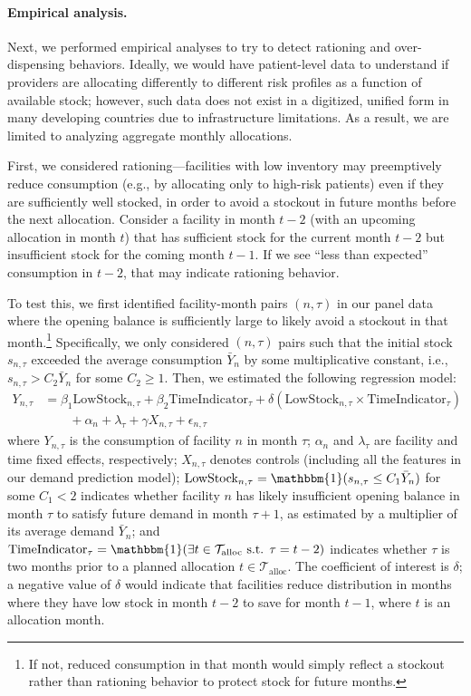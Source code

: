 \documentclass[12pt]{article}
\begin{document}
\paragraph{Empirical analysis.}

Next, we performed empirical analyses to try to detect rationing and over-dispensing behaviors. Ideally, we would have patient-level data to understand if providers are allocating differently to different risk profiles as a function of available stock; however, such data does not exist in a digitized, unified form in many developing countries due to infrastructure limitations. As a result, we are limited to analyzing aggregate monthly allocations.

First, we considered rationing---facilities with low inventory may preemptively reduce consumption (e.g., by allocating only to high-risk patients) even if they are sufficiently well stocked, in order to avoid a stockout in future months before the next allocation. Consider a facility in month $t-2$ (with an upcoming allocation in month $t$) that has sufficient stock for the current month $t-2$ but insufficient stock for the coming month $t-1$. If we see ``less than expected'' consumption in $t-2$, that may indicate rationing behavior.

To test this, we first identified facility-month pairs $(n,\tau)$ in our panel data where the opening balance is sufficiently large to likely avoid a stockout in that month.\footnote{If not, reduced consumption in that month would simply reflect a stockout rather than rationing behavior to protect stock for future months.} Specifically, we only considered $(n,\tau)$ pairs such that the initial stock $s_{n,\tau}$ exceeded the average consumption $\bar{Y}_n$ by some multiplicative constant, i.e., $s_{n,\tau}>C_2\bar{Y}_n$ for some $C_2\ge1$. Then, we estimated the following regression model:
\begin{align}
\label{eqn:rationingspec}
Y_{n,\tau} &= \beta_1 \text{LowStock}_{n,\tau} + \beta_2 \text{TimeIndicator}_\tau
+ \delta (\text{LowStock}_{n,\tau} \times \text{TimeIndicator}_\tau) \nonumber\\
&\qquad+ \alpha_n + \lambda_\tau + \gamma X_{n,\tau} + \epsilon_{n,\tau}
\end{align}
where $Y_{n,\tau}$ is the consumption of facility $n$ in month $\tau$; $\alpha_n$ and $\lambda_\tau$ are facility and time fixed effects, respectively; $X_{n,\tau}$ denotes controls (including all the features in our demand prediction model); $\text{LowStock}_{n,\tau}=\mathbbm{1}(s_{n,\tau}\le C_1\bar{Y}_n)$ for some $C_1 < 2$ indicates whether facility $n$ has likely insufficient opening balance in month $\tau$ to satisfy future demand in month $\tau + 1$, as estimated by a multiplier of its average demand $\bar{Y}_n$; and $\text{TimeIndicator}_{\tau}=\mathbbm{1}(\exists t\in\mathcal{T}_{\text{alloc}}\text{ s.t. }\tau=t-2)$ indicates whether $\tau$ is two months prior to a planned allocation $t\in\mathcal{T}_{\text{alloc}}$. The coefficient of interest is $\delta$; a negative value of $\delta$ would indicate that facilities reduce distribution in months where they have low stock in month $t-2$ to save for month $t-1$, where $t$ is an allocation month.
\end{document}

